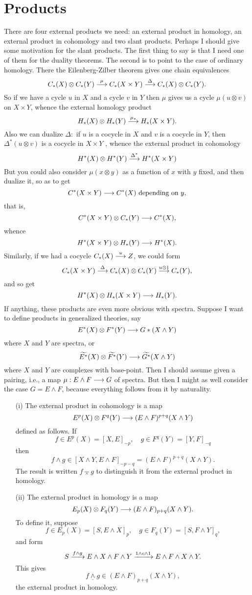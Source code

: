 \documentclass[../main]{subfiles}
\begin{document}
\chapter{Products}
\label{sec:p3c09}
\par There are four external products we need: an external product in homology, an external product in cohomology and two slant products. Perhaps I should give some motivation for the slant products. The first thing to say is that I need one of them for the duality theorems. The second is to point to the case of ordinary homology. There the Eilenberg-Zilber theorem gives one chain equivalences
$$C_\ast(X) \otimes C_\ast(Y) \overset{\mu}{\longrightarrow} C_\ast(X\times Y)\overset{\Delta}{\longrightarrow}C_\ast(X) \otimes C_\ast(Y).$$
So if we have a cycle $u$ in $X$ and a cycle $v$ in $Y$ then $\mu$ gives us a cycle $\mu(u\otimes v)$ on $X \times Y$, whence the external homology product
$$H_\ast(X) \otimes H_\ast(Y) \overset{\mu_\ast}{\longrightarrow}H_\ast(X\times Y).$$
Also we can dualize $\Delta:$ if $u$ is a cocycle in $X$ and $v$ is a cocycle in $Y$, then $\Delta^\ast(u\otimes v)$ is a cocycle in $X \times Y$ , whence the external product in cohomology
$$H^\ast(X)\otimes H^\ast(Y) \overset{\Delta^\ast}{\longrightarrow}H^\ast(X\times Y)$$
But you could also consider $\mu(x\otimes y)$ as a function of $x$ with $y$ fixed, and then dualize it, so as to get
$$C^\ast(X\times Y) \overset{}{\longrightarrow} C^\ast(X) \text{ depending on $y$,}$$
that is,
$$C^\ast(X \times Y) \otimes C_\ast(Y) \overset{}{\longrightarrow} C^\ast(X),$$
whence
$$H^\ast(X\times Y)\otimes H_\ast(Y) \overset{}{\longrightarrow} H^\ast(X).$$
Similarly, if we had a cocycle $C_\ast(X) \overset{u}{\longrightarrow} Z$, we could form
$$C_\ast(X \times Y) \overset{\Delta}{\longrightarrow} C_\ast(X)\otimes C_\ast(Y) \overset{u\otimes 1}{\longrightarrow} C_\ast(Y),$$
and so get
$$H^\ast(X)\otimes H_\ast(X\times Y) \overset{}{\longrightarrow} H_\ast(Y).$$
If anything, these products are even more obvious with spectra.  Suppose I want to define products in generalized theories, say
$$E^\ast(X) \otimes F^\ast(Y) \overset{}{\longrightarrow} G\ast(X \wedge Y)$$
where $X$ and $Y$ are spectra, or
$$\widetilde {E^\ast}(X) \otimes \widetilde {F^\ast}(Y) \overset{}{\longrightarrow} \widetilde {G^\ast}(X \wedge Y)$$
where $X$ and $Y$ are complexes with base-point. Then I should assume given a pairing, i.e., a map $\mu : E \wedge F \overset{}{\longrightarrow} G$ of spectra. But then I might as well consider the case $G = E \wedge F$, because everything follows from it by naturality.
\begin{enumerate}
	\item[(i)] The external product in cohomology is a map $$E^p(X) \otimes F^q(Y) \overset{}{\longrightarrow} (E \wedge F)^{p + q} (X \wedge Y)$$ defined as follows. If $$f \in E^p(X) = [X, E]_{-p}, \quad g \in F^q(Y) = [Y, F]_{-q}$$ then $$f \wedge g \in [X \wedge Y, E \wedge F]_{-p - q} = (E \wedge F)^{p + q}(X \wedge Y).$$ The result is written $f \barwedge g$ to distinguish it from the external product in homology.
	\item[(ii)] The external product in homology is a map $$E_p(X) \otimes F_q(Y) \overset{}{\longrightarrow} (E \wedge F)_{p + q}(X \wedge Y).$$ To define it, suppose $$f \in E_p(X) = [S, E \wedge X]_p, \quad g \in F_q(Y) = [S, F \wedge Y]_q,$$ and form $$S \vra{f \wedge g} E \wedge X \wedge F \wedge Y \vra {1 \wedge c \wedge 1} E \wedge F \wedge X \wedge Y.$$ This gives $$f \underline \wedge g \in (E \wedge F)_{p + q}(X \wedge Y),$$ the external product in homology.
\end{enumerate}
\end{document}
